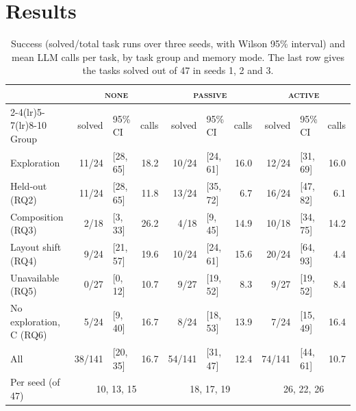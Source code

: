 \documentclass[conference]{IEEEtran}
\newcommand{\modeNone}{\textsc{none}}
\newcommand{\modePassive}{\textsc{passive}}
\newcommand{\modeActive}{\textsc{active}}
\begin{document}
\section{Results}
\label{sec:results}
\begin{table}[t]
\centering
\caption{Success (solved/total task runs over three seeds, with Wilson 95\% interval) and mean LLM calls per task, by task group and memory mode. The last row gives the tasks solved out of 47 in seeds 1, 2 and 3.}
\label{tab:main}
\begin{tabular}{l rlr rlr rlr}
\toprule
& \multicolumn{3}{c}{\modeNone} & \multicolumn{3}{c}{\modePassive} & \multicolumn{3}{c}{\modeActive} \\
\cmidrule(lr){2-4}\cmidrule(lr){5-7}\cmidrule(lr){8-10}
Group & solved & 95\% CI & calls & solved & 95\% CI & calls & solved & 95\% CI & calls \\
\midrule
Exploration         & 11/24 & [28, 65] & 18.2 & 10/24 & [24, 61] & 16.0 & 12/24 & [31, 69] & 16.0 \\
Held-out (RQ2)      & 11/24 & [28, 65] & 11.8 & 13/24 & [35, 72] &  6.7 & 16/24 & [47, 82] &  6.1 \\
Composition (RQ3)   & 2/18  & [3, 33]  & 26.2 & 4/18  & [9, 45]  & 14.9 & 10/18 & [34, 75] & 14.2 \\
Layout shift (RQ4)  & 9/24  & [21, 57] & 19.6 & 10/24 & [24, 61] & 15.6 & 20/24 & [64, 93] &  4.4 \\
Unavailable (RQ5)   & 0/27  & [0, 12]  & 10.7 & 9/27  & [19, 52] &  8.3 & 9/27  & [19, 52] &  8.4 \\
No exploration, C (RQ6) & 5/24 & [9, 40] & 16.7 & 8/24 & [18, 53] & 13.9 & 7/24 & [15, 49] & 16.4 \\
\midrule
All                 & 38/141 & [20, 35] & 16.7 & 54/141 & [31, 47] & 12.4 & 74/141 & [44, 61] & 10.7 \\
Per seed (of 47)    & \multicolumn{3}{c}{10, 13, 15} & \multicolumn{3}{c}{18, 17, 19} & \multicolumn{3}{c}{26, 22, 26} \\
\bottomrule
\end{tabular}
\end{table}
\end{document}
